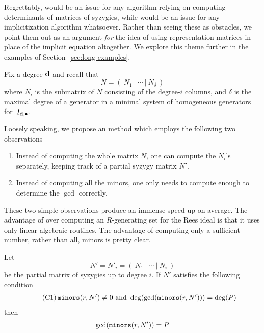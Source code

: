 \documentclass[fleqn,reqno]{amsart}
\numberwithin{first}{chapter}
\begin{document}
\begin{paragraf*}
Regrettably,
 would be an issue for any algorithm
relying on computing determinants of matrices of syzygies,
while 
would be an issue for any implicitization algorithm whatsoever.
Rather than seeing these as obstacles,
we point them out as an argument {\em for} the idea of using
representation matrices in place of the implicit equation altogether.
We explore this theme further in the examples of Section~\ref{sec:long-examples}.
\end{paragraf*}

\begin{paragraf}
\label{par:proposed}
Fix a degree $\mathbf d$ and recall that
\[
	N=(~N_1~|~\cdots~|~N_\delta~)
\]
where $N_i$ is the submatrix of $N$ consisting of the degree-$i$ columns,
and $\delta$ is the maximal degree of a generator
in a minimal system of homogeneous generators for~$I_{\mathbf d,\bullet}$.

Loosely speaking, we propose an method which employs the following two observations
\begin{enumerate}
\item
\label{itm:N'}
Instead of computing the whole matrix $N$, one can compute the $N_i$'s separately,
keeping track of a partial syzygy matrix $N'$.
\item
\label{itm:gcd}
Instead of computing all the minors, one only needs to compute enough to determine
the $\gcd$ correctly.
\end{enumerate}
\end{paragraf}

\begin{paragraf*}
These two simple observations produce an immense speed up on average.
The advantage of  over computing an $R$-generating set for the
Rees ideal is that it uses only linear algebraic routines.
The advantage of computing only a sufficient number, rather than all, minors is pretty clear.
\end{paragraf*}

\begin{lemma}
\label{lemma:C1}
Let
\[
	N'=N'_i=(~N_1~|~\cdots~|~N_i~)
\]
be the partial matrix of syzygies up to degree $i$.
If $N'$ satisfies the following condition
\begin{align}
	\label{C:OK-matrix}
	\tag{C1}
	\mathop{\tt minors}(r,N')\neq0 \text{ and } \deg(\gcd(\mathop{\tt minors}(r,N')))=\deg(P)
\end{align}
then
\[
\gcd(\mathop{\tt minors}(r,N'))=P
\]
\end{lemma}
\end{document}
